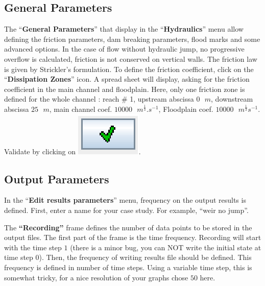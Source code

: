 \documentclass[a4paper,12pt]{article}
\begin{document}
\subsection{General Parameters}

\hspace{0.5cm} The {}``\textbf{General Parameters}'' that display in the {}``\textbf{Hydraulics}''
menu allow defining the friction parameters, dam breaking parameters,
flood marks and some advanced options. In the case of flow without
hydraulic jump, no progressive overflow is calculated, friction is
not conserved on vertical walls. The friction law is  given by Strickler's formulation. To define the friction coefficient, click on the {}``\textbf{Dissipation
Zones}'' icon. A spread sheet will display, asking for the friction coefficient
in the main channel and floodplain. Here, only one friction zone
is defined for the whole channel : reach \# 1, upstream abscissa
$0\mbox{ }m$, downstream abscissa $25\mbox{ }m$, main channel coef. $10000\mbox{ }m^\frac{1}{3}.s^{-1}$, Floodplain coef.
$10000\mbox{ }m^\frac{1}{3}s^{-1}$. Validate by clicking on \includegraphics[scale=0.6]{valid}.


\subsection{Output Parameters}

\hspace{0.5cm} In the {}``\textbf{Edit results parameters}'' menu, frequency on the output results is defined.
First, enter a name for your case study. For
example, {}``weir no jump''.

\vspace{0.5cm}

The \textbf{{}``Recording''} frame defines the number of data points
to be stored in the output files. The first part of the frame is the time frequency.
Recording will start with the time step $1$ (there is a minor bug, you
can NOT write the initial state at time step $0$). Then, the frequency
of writing results file should be defined. This frequency is
defined in number of time steps. Using a variable time step, this
is somewhat tricky, for a nice resolution of your graphs chose $50$
here. 

\vspace{0.5cm}
\end{document}
